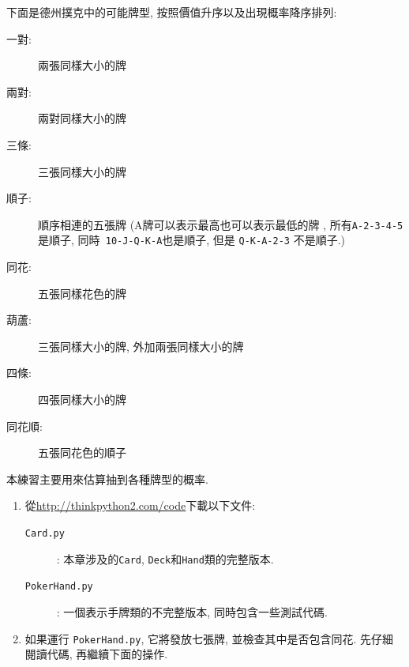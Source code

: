 \documentclass[10pt]{book}
\begin{document}
\begin{exercise}
\label{poker}
下面是德州撲克中的可能牌型, 按照價值升序以及出現概率降序排列:

\begin{description}

\item[一對:] 兩張同樣大小的牌
\vspace{-0.05in}

\item[兩對:] 兩對同樣大小的牌
\vspace{-0.05in}

\item[三條:] 三張同樣大小的牌
\vspace{-0.05in}

\item[順子:] 順序相連的五張牌 (A牌可以表示最高也可以表示最低的牌
, 所有{\tt A-2-3-4-5}是順子, 同時{\tt
10-J-Q-K-A}也是順子, 但是 {\tt Q-K-A-2-3} 不是順子.)
\vspace{-0.05in}

\item[同花:] 五張同樣花色的牌
\vspace{-0.05in}

\item[葫蘆:] 三張同樣大小的牌, 外加兩張同樣大小的牌
\vspace{-0.05in}

\item[四條:] 四張同樣大小的牌
\vspace{-0.05in}

\item[同花順:] 五張同花色的順子
\vspace{-0.05in}

\end{description}
%
本練習主要用來估算抽到各種牌型的概率.

\begin{enumerate}

\item 從\url{http://thinkpython2.com/code}下載以下文件:

\begin{description}

\item[{\tt Card.py}]: 本章涉及的{\tt Card},
{\tt Deck}和{\tt Hand}類的完整版本. 

\item[{\tt PokerHand.py}]: 一個表示手牌類的不完整版本, 同時包含一些測試代碼.

\end{description}
%
\item 如果運行 {\tt PokerHand.py}, 它將發放七張牌, 
並檢查其中是否包含同花. 先仔細閱讀代碼, 再繼續下面的操作. 


\end{enumerate}
\end{exercise}
\end{document}
